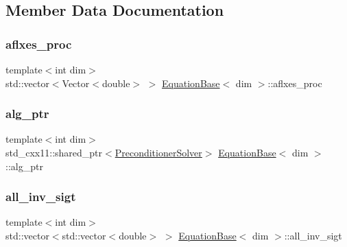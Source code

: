 \subsection{Member Data Documentation}
\mbox{\label{class_equation_base_aa5a26770211dc6c8b2c17e35deffa60b}} 
\subsubsection{\texorpdfstring{aflxes\+\_\+proc}{aflxes\_proc}}
{\footnotesize\ttfamily template$<$int dim$>$ \\
std\+::vector$<$Vector$<$double$>$ $>$ \hyperlink{class_equation_base}{Equation\+Base}$<$ dim $>$\+::aflxes\+\_\+proc\hspace{0.3cm}{\ttfamily [private]}}

\mbox{\label{class_equation_base_aa4b83dfa34d4588cf3250a21ffc2e984}} 
\subsubsection{\texorpdfstring{alg\+\_\+ptr}{alg\_ptr}}
{\footnotesize\ttfamily template$<$int dim$>$ \\
std\+\_\+cxx11\+::shared\+\_\+ptr$<$\hyperlink{class_preconditioner_solver}{Preconditioner\+Solver}$>$ \hyperlink{class_equation_base}{Equation\+Base}$<$ dim $>$\+::alg\+\_\+ptr\hspace{0.3cm}{\ttfamily [private]}}

\mbox{\label{class_equation_base_aedead29f1c4bb6b9f7b17b1fe1441c5f}} 
\subsubsection{\texorpdfstring{all\+\_\+inv\+\_\+sigt}{all\_inv\_sigt}}
{\footnotesize\ttfamily template$<$int dim$>$ \\
std\+::vector$<$std\+::vector$<$double$>$ $>$ \hyperlink{class_equation_base}{Equation\+Base}$<$ dim $>$\+::all\+\_\+inv\+\_\+sigt\hspace{0.3cm}{\ttfamily [protected]}}

